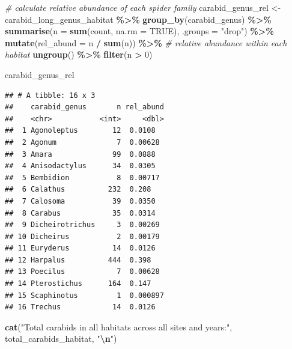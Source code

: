 \documentclass[
]{article}
\newenvironment{Shaded}{\begin{snugshade}}{\end{snugshade}}
\newcommand{\AttributeTok}[1]{\textcolor[rgb]{0.13,0.29,0.53}{#1}}
\newcommand{\CommentTok}[1]{\textcolor[rgb]{0.56,0.35,0.01}{\textit{#1}}}
\newcommand{\ConstantTok}[1]{\textcolor[rgb]{0.56,0.35,0.01}{#1}}
\newcommand{\DecValTok}[1]{\textcolor[rgb]{0.00,0.00,0.81}{#1}}
\newcommand{\FunctionTok}[1]{\textcolor[rgb]{0.13,0.29,0.53}{\textbf{#1}}}
\newcommand{\NormalTok}[1]{#1}
\newcommand{\OtherTok}[1]{\textcolor[rgb]{0.56,0.35,0.01}{#1}}
\newcommand{\SpecialCharTok}[1]{\textcolor[rgb]{0.81,0.36,0.00}{\textbf{#1}}}
\newcommand{\StringTok}[1]{\textcolor[rgb]{0.31,0.60,0.02}{#1}}
\begin{document}
\begin{Shaded}
\begin{Highlighting}[]
\CommentTok{\# calculate relative abundance of each spider family}
\NormalTok{carabid\_genus\_rel }\OtherTok{\textless{}{-}}\NormalTok{ carabid\_long\_genus\_habitat }\SpecialCharTok{\%\textgreater{}\%}
  \FunctionTok{group\_by}\NormalTok{(carabid\_genus) }\SpecialCharTok{\%\textgreater{}\%}
  \FunctionTok{summarise}\NormalTok{(}\AttributeTok{n =} \FunctionTok{sum}\NormalTok{(count, }\AttributeTok{na.rm =} \ConstantTok{TRUE}\NormalTok{), }\AttributeTok{.groups =} \StringTok{"drop"}\NormalTok{) }\SpecialCharTok{\%\textgreater{}\%}
  \FunctionTok{mutate}\NormalTok{(}\AttributeTok{rel\_abund =}\NormalTok{ n }\SpecialCharTok{/} \FunctionTok{sum}\NormalTok{(n)) }\SpecialCharTok{\%\textgreater{}\%}   \CommentTok{\# relative abundance within each habitat}
  \FunctionTok{ungroup}\NormalTok{() }\SpecialCharTok{\%\textgreater{}\%}
  \FunctionTok{filter}\NormalTok{(n }\SpecialCharTok{\textgreater{}} \DecValTok{0}\NormalTok{)}

\NormalTok{carabid\_genus\_rel}
\end{Highlighting}
\end{Shaded}

\begin{verbatim}
## # A tibble: 16 x 3
##    carabid_genus       n rel_abund
##    <chr>           <int>     <dbl>
##  1 Agonoleptus        12  0.0108  
##  2 Agonum              7  0.00628 
##  3 Amara              99  0.0888  
##  4 Anisodactylus      34  0.0305  
##  5 Bembidion           8  0.00717 
##  6 Calathus          232  0.208   
##  7 Calosoma           39  0.0350  
##  8 Carabus            35  0.0314  
##  9 Dicheirotrichus     3  0.00269 
## 10 Dicheirus           2  0.00179 
## 11 Euryderus          14  0.0126  
## 12 Harpalus          444  0.398   
## 13 Poecilus            7  0.00628 
## 14 Pterostichus      164  0.147   
## 15 Scaphinotus         1  0.000897
## 16 Trechus            14  0.0126
\end{verbatim}

\begin{Shaded}
\begin{Highlighting}[]
\FunctionTok{cat}\NormalTok{(}\StringTok{"Total carabids in all habitats across all sites and years:"}\NormalTok{, total\_carabids\_habitat, }\StringTok{"}\SpecialCharTok{\textbackslash{}n}\StringTok{"}\NormalTok{)}
\end{Highlighting}
\end{Shaded}
\end{document}
